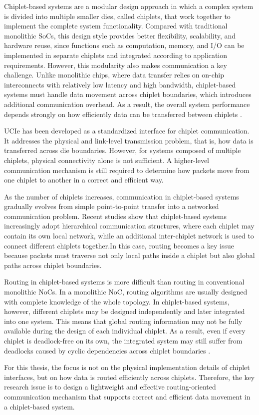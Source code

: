 Chiplet-based systems are a modular design approach in which a complex system is divided into multiple smaller dies, called chiplets, that work together to implement the complete system functionality. Compared with traditional monolithic SoCs, this design style provides better flexibility, scalability, and hardware reuse, since functions such as computation, memory, and I/O can be implemented in separate chiplets and integrated according to application requirements. However, this modularity also makes communication a key challenge. Unlike monolithic chips, where data transfer relies on on-chip interconnects with relatively low latency and high bandwidth, chiplet-based systems must handle data movement across chiplet boundaries, which introduces additional communication overhead. As a result, the overall system performance depends strongly on how efficiently data can be transferred between chiplets \cite{11265742}.

UCIe has been developed as a standardized interface for chiplet communication. It addresses the physical and link-level transmission problem, that is, how data is transferred across die boundaries. However, for systems composed of multiple chiplets, physical connectivity alone is not sufficient. A higher-level communication mechanism is still required to determine how packets move from one chiplet to another in a correct and efficient way.

As the number of chiplets increases, communication in chiplet-based systems gradually evolves from simple point-to-point transfer into a networked communication problem. Recent studies show that chiplet-based systems increasingly adopt hierarchical communication structures, where each chiplet may contain its own local network, while an additional inter-chiplet network is used to connect different chiplets together.In this case, routing becomes a key issue because packets must traverse not only local paths inside a chiplet but also global paths across chiplet boundaries.

Routing in chiplet-based systems is more difficult than routing in conventional monolithic NoCs. In a monolithic NoC, routing algorithms are usually designed with complete knowledge of the whole topology. In chiplet-based systems, however, different chiplets may be designed independently and later integrated into one system. This means that global routing information may not be fully available during the design of each individual chiplet. As a result, even if every chiplet is deadlock-free on its own, the integrated system may still suffer from deadlocks caused by cyclic dependencies across chiplet boundaries \cite{chen2022design}.

For this thesis, the focus is not on the physical implementation details of chiplet interfaces, but on how data is routed efficiently across chiplets. Therefore, the key research issue is to design a lightweight and effective routing-oriented communication mechanism that supports correct and efficient data movement in a chiplet-based system.